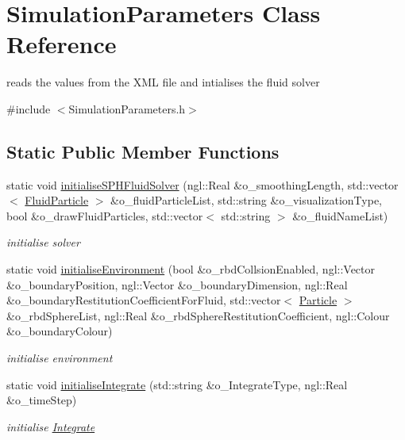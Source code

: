 \hypertarget{class_simulation_parameters}{
\section{SimulationParameters Class Reference}
\label{class_simulation_parameters}
}


reads the values from the XML file and intialises the fluid solver  




{\ttfamily \#include $<$SimulationParameters.h$>$}

\subsection*{Static Public Member Functions}
\begin{DoxyCompactItemize}
\item 
static void \hyperlink{class_simulation_parameters_aa9389962f767734ad8f0ffc63cb0ed46}{initialiseSPHFluidSolver} (ngl::Real \&o\_\-smoothingLength, std::vector$<$ \hyperlink{class_fluid_particle}{FluidParticle} $>$ \&o\_\-fluidParticleList, std::string \&o\_\-visualizationType, bool \&o\_\-drawFluidParticles, std::vector$<$ std::string $>$ \&o\_\-fluidNameList)
\begin{DoxyCompactList}\small\item\em initialise solver \item\end{DoxyCompactList}\item 
static void \hyperlink{class_simulation_parameters_abdf9f384bef40423ebb38515f206b08d}{initialiseEnvironment} (bool \&o\_\-rbdCollsionEnabled, ngl::Vector \&o\_\-boundaryPosition, ngl::Vector \&o\_\-boundaryDimension, ngl::Real \&o\_\-boundaryRestitutionCoefficientForFluid, std::vector$<$ \hyperlink{class_particle}{Particle} $>$ \&o\_\-rbdSphereList, ngl::Real \&o\_\-rbdSphereRestitutionCoefficient, ngl::Colour \&o\_\-boundaryColour)
\begin{DoxyCompactList}\small\item\em initialise environment \item\end{DoxyCompactList}\item 
static void \hyperlink{class_simulation_parameters_a3ed48742e248d138da5cbe4d5068b576}{initialiseIntegrate} (std::string \&o\_\-IntegrateType, ngl::Real \&o\_\-timeStep)
\begin{DoxyCompactList}\small\item\em initialise \hyperlink{class_integrate}{Integrate} \item\end{DoxyCompactList}\item 

\end{DoxyCompactItemize}
